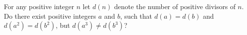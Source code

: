 For any positive integer $n $ let $ d(n) $ denote the number of positive divisors of $ n $. Do there exist positive integers $ a $ and $b $,  such that $ d(a)=d(b)$ and $ d(a^2 ) = d(b^2 ) $,  but $ d(a^3 ) \ne d(b^3 ) $?